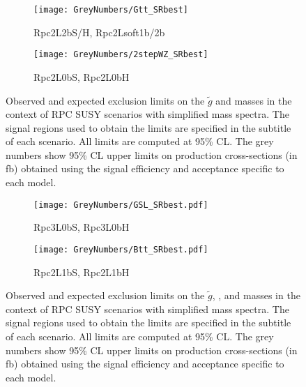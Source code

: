 \begin{figure}[htb!]
\centering
\begin{subfigure}[t]{0.49\textwidth}\texttt{[image: GreyNumbers/Gtt\_SRbest]}\caption{Rpc2L2bS/H, Rpc2Lsoft1b/2b}\label{fig:GN_limits_feynman_gtt}\end{subfigure}
\begin{subfigure}[t]{0.49\textwidth}\texttt{[image: GreyNumbers/2stepWZ\_SRbest]}\caption{Rpc2L0bS, Rpc2L0bH}\label{fig:GN_limits_feynman_gg2WZ}\end{subfigure}

\caption{Observed and expected exclusion limits on the $\tilde{g}$ and \ninoone masses 
in the context of RPC SUSY scenarios with simplified mass spectra. The signal regions used to obtain the limits are specified in the subtitle of each scenario. All limits are computed at 95\% CL. 
The grey numbers show 95\% CL upper limits on production cross-sections (in fb) obtained using the signal efficiency and acceptance specific to each model.}
\label{fig:Results_Limits_RPC_GN} 
\end{figure} 

\begin{figure}[htb!]
\centering
\begin{subfigure}[t]{0.49\textwidth}\texttt{[image: GreyNumbers/GSL\_SRbest.pdf]}\caption{Rpc3L0bS, Rpc3L0bH}\label{fig:GN_limits_feynman_gg2sl}\end{subfigure}
\begin{subfigure}[t]{0.49\textwidth}\texttt{[image: GreyNumbers/Btt\_SRbest.pdf]}\caption{Rpc2L1bS, Rpc2L1bH}\label{fig:GN_limits_feynman_b1b1}\end{subfigure}

\caption{Observed and expected exclusion limits on the $\tilde{g}$, \sbottomone, and \ninoone masses 
in the context of RPC SUSY scenarios with simplified mass spectra. The signal regions used to obtain the limits are specified in the subtitle of each scenario. All limits are computed at 95\% CL. 
The grey numbers show 95\% CL upper limits on production cross-sections (in fb) obtained using the signal efficiency and acceptance specific to each model.}
\label{fig:Results_Limits_RPC_GN} 
\end{figure} 


